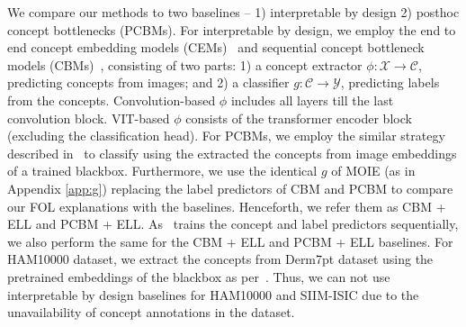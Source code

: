 We compare our methods to two baselines -- 1) interpretable by design 2) posthoc concept bottlenecks (PCBMs). For interpretable by design, we employ the end to end concept embedding models (CEMs)~\cite{zarlenga2022concept} and sequential concept bottleneck models (CBMs)~\cite{koh2020concept}, consisting of two parts: 1) a concept extractor $\phi: \mathcal{X} \rightarrow \mathcal{C}$, predicting concepts from images; and 2) a classifier $g: \mathcal{C} \rightarrow \mathcal{Y}$, predicting labels from the concepts. Convolution-based $\phi$ includes all layers till the last convolution block. VIT-based $\phi$ consists of the transformer encoder block (excluding the classification head). For PCBMs, we employ the similar strategy described in~\cite{yuksekgonul2022post} to classify using the extracted the concepts from image embeddings of a trained blackbox. Furthermore, we use the identical $g$ of MOIE (as in Appendix \ref{app:g}) replacing the label predictors of CBM and PCBM to compare our FOL explanations with the baselines. Henceforth, we refer them as CBM + ELL and PCBM + ELL. As~\cite{barbiero2022entropy} trains the concept and label predictors sequentially, we also perform the same for the CBM + ELL and PCBM + ELL baselines. For HAM10000 dataset, we extract the concepts from Derm7pt dataset using the pretrained embeddings of the blackbox as per~\cite{yuksekgonul2022post}. Thus, we can not use interpretable by design baselines for HAM10000 and SIIM-ISIC due to the unavailability of concept annotations in the dataset.